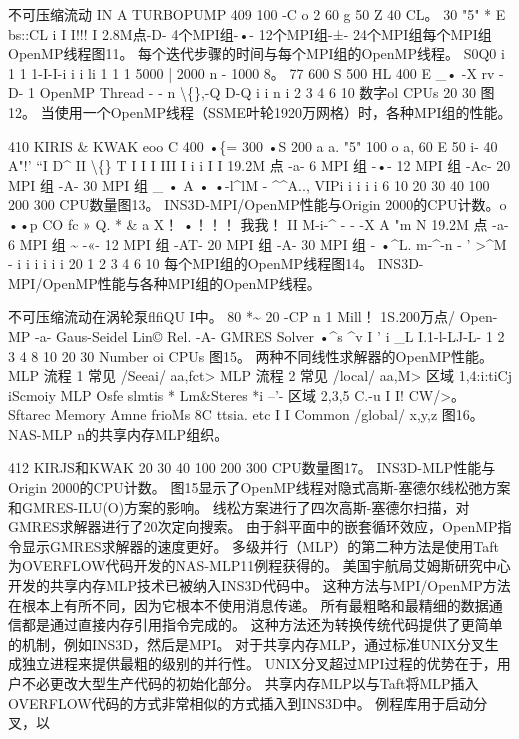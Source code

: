 \documentclass[UTF8,11pt,a4paper,openany,fontset=fandol]{ctexbook}
\begin{document}
不可压缩流动 IN A TURBOPUMP 409 100 -C o 2 60 g 50 Z 40 CL。 30 "5" * E bs::CL i I I!!! I 2.8M点-D- 4个MPI组-•- 12个MPI组-±- 24个MPI组每个MPI组OpenMP线程图11。 每个迭代步骤的时间与每个MPI组的OpenMP线程。 S0Q0 i 1 1 1-I-I-i i i li 1 1 1 5000 | 2000 n - 1000 8。 77 600 S 500 HL 400 E \_• -X rv -D- 1 OpenMP Thread - - n \textbackslash\{\},-Q D-Q i i n i 2 3 4 6 10 数字ol CPUs 20 30 图12。 当使用一个OpenMP线程（SSME叶轮1920万网格）时，各种MPI组的性能。

410 KIRIS \& KWAK eoo C 400 •\{= 300 •S 200 a a. "5" 100 o a, 60 E 50 i- 40 A"!' “I D\textasciicircum{} II \textbackslash\{\} T I I I III I i i I I 19.2M 点 -a- 6 MPI 组 -•- 12 MPI 组 -Ac- 20 MPI 组 -A- 30 MPI 组 \_ • A • •-l\textasciicircum{}lM - \textasciicircum{}\textasciicircum{}A.., VIPi i i i i 6 10 20 30 40 100 200 300 CPU数量图13。 INS3D-MPI/OpenMP性能与Origin 2000的CPU计数。o ••p CO fc » Q. * \& a X！ •！！！ 我我！ II M-i-\textasciicircum{} - - -X A "m N 19.2M 点 -a- 6 MPI 组 \textasciitilde{} -«- 12 MPI 组 -AT- 20 MPI 组 -A- 30 MPI 组 - •\textasciicircum{}L. m-\textasciicircum{}-n - ' >\textasciicircum{}M - i i i i i i 20 1 2 3 4 6 10 每个MPI组的OpenMP线程图14。 INS3D-MPI/OpenMP性能与各种MPI组的OpenMP线程。

不可压缩流动在涡轮泵flfiQU I中。 80 *\textasciitilde{} 20 -CP n 1 Mill！ 1S.200万点/ Open-MP -a- Gaus-Seidel Lin© Rel. -A- GMRES Solver •\textasciicircum{}s \textasciicircum{}v I ' i \_L I.1-l-LJ-L- 1 2 3 4 8 10 20 30 Number oi CPUs 图15。 两种不同线性求解器的OpenMP性能。 MLP 流程 1 常见 /Seeai/ aa,fct> MLP 流程 2 常见 /local/ aa,M> 区域 1,4:i:tiCj iScmoiy MLP Osfe slmtis * Lm\&Steres *i --'- 区域 2,3,5 C.-u I I! CW/>。 Sftarec Memory Amne frioMs 8C ttsia. etc I I Common /global/ x,y,z 图16。 NAS-MLP n的共享内存MLP组织。

412 KIRJS和KWAK 20 30 40 100 200 300 CPU数量图17。 INS3D-MLP性能与Origin 2000的CPU计数。 图15显示了OpenMP线程对隐式高斯-塞德尔线松弛方案和GMRES-ILU(O)方案的影响。 线松方案进行了四次高斯-塞德尔扫描，对GMRES求解器进行了20次定向搜索。 由于斜平面中的嵌套循环效应，OpenMP指令显示GMRES求解器的速度更好。 多级并行（MLP）的第二种方法是使用Taft为OVERFLOW代码开发的NAS-MLP11例程获得的。 美国宇航局艾姆斯研究中心开发的共享内存MLP技术已被纳入INS3D代码中。 这种方法与MPI/OpenMP方法在根本上有所不同，因为它根本不使用消息传递。 所有最粗略和最精细的数据通信都是通过直接内存引用指令完成的。 这种方法还为转换传统代码提供了更简单的机制，例如INS3D，然后是MPI。 对于共享内存MLP，通过标准UNIX分叉生成独立进程来提供最粗的级别的并行性。 UNIX分叉超过MPI过程的优势在于，用户不必更改大型生产代码的初始化部分。 共享内存MLP以与Taft将MLP插入OVERFLOW代码的方式非常相似的方式插入到INS3D中。 例程库用于启动分叉，以
\end{document}
